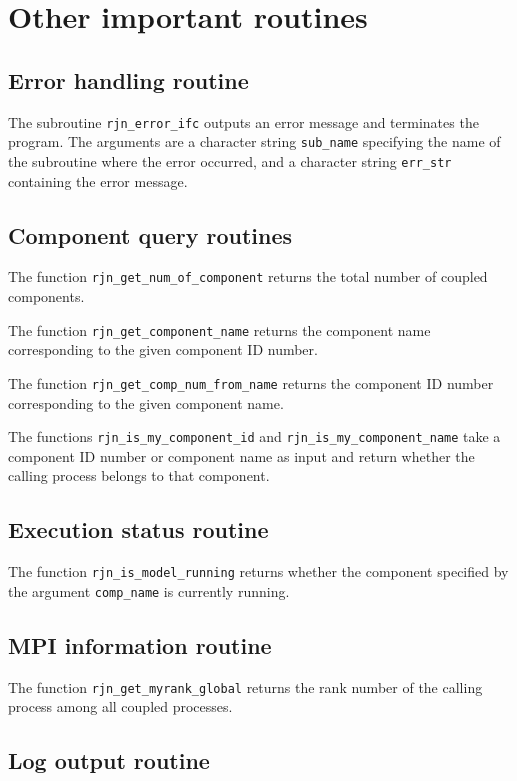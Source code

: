 \documentclass[11pt,a4paper]{report}
\begin{document}
\section{Other important routines}

\subsection{Error handling routine}

The subroutine \texttt{rjn\_error\_ifc}
outputs an error message and terminates the program.
The arguments are
a character string \texttt{sub\_name}
specifying the name of the subroutine where the error occurred,
and a character string \texttt{err\_str}
containing the error message.

\subsection{Component query routines}

The function \texttt{rjn\_get\_num\_of\_component}
returns the total number of coupled components.

The function \texttt{rjn\_get\_component\_name}
returns the component name
corresponding to the given component ID number.

The function \texttt{rjn\_get\_comp\_num\_from\_name}
returns the component ID number
corresponding to the given component name.

The functions \texttt{rjn\_is\_my\_component\_id}
and \texttt{rjn\_is\_my\_component\_name}
take a component ID number or component name as input
and return whether the calling process belongs to that component.

\subsection{Execution status routine}

The function \texttt{rjn\_is\_model\_running}
returns whether the component
specified by the argument \texttt{comp\_name}
is currently running.

\subsection{MPI information routine}

The function \texttt{rjn\_get\_myrank\_global}
returns the rank number of the calling process
among all coupled processes.

\subsection{Log output routine}
\end{document}

